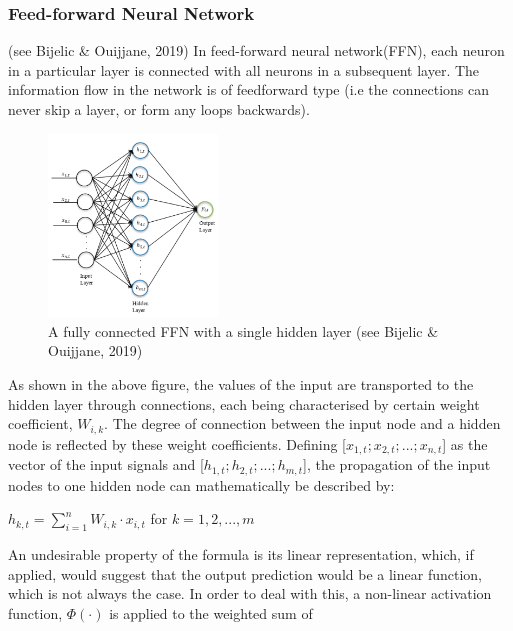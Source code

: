 \documentclass[a4paper,11pt,oneside]{book}
\begin{document}
 \subsubsection{Feed-forward Neural Network} (see Bijelic \& Ouijjane, 2019)
 In feed-forward neural network(FFN), each neuron in a
 particular layer is connected with all neurons in a subsequent layer. The information
 flow in the network is of feedforward type (i.e the connections
 can never skip a layer, or form any loops backwards).\newline\newline\newline\newline\newline\newline
 \begin{figure}
 	\centering
 	\includegraphics[width=0.4\textwidth]{figures/FFN}
 	\caption{A fully connected FFN with a single hidden layer (see Bijelic \& Ouijjane, 2019)}
 	
 	\label{sixthfig}
 \end{figure}
\newline
 As shown in the above figure, the values of the input are transported to the hidden layer through connections, each being characterised by certain weight coefficient, $W_{i,k}$. The degree of connection between the input node and a hidden node is reflected by these weight coefficients. Defining [$x_{1,t};x_{2,t};...;x_{n,t}$] as the vector of the input signals and [$h_{1,t};h_{2,t};...;h_{m,t}$], the propagation of the input nodes to one hidden node can
 mathematically be described by: \newline
 \begin{center}


 $h_{k,t} =\sum_{i=1}^{n} W_{i,k} \cdot x_{i,t}$ for $k = 1,2,...,m$
  \end{center}
An undesirable property of the formula is its linear representation,
which, if applied, would suggest that the output prediction would be a linear function, which is not always the case. In order to deal with this, a non-linear activation function, $\Phi(\cdot)$ is applied to the weighted sum of
\end{document}
